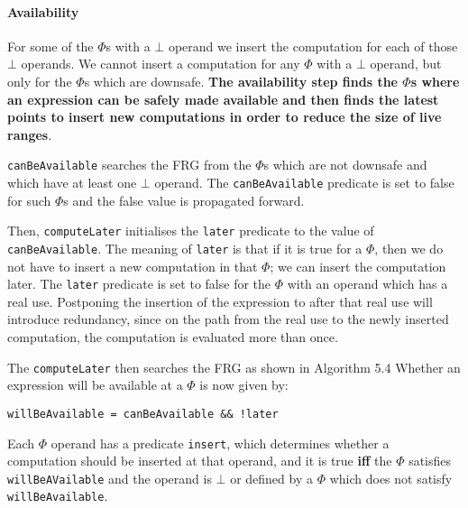 \documentclass[a4paper,12pt, notitlepage]{article}
\renewcommand{\iff}{\textbf{ iff }}
\begin{document}
\paragraph*{Availability}
For some of the $\Phi$s with a $\bot$ operand we insert the computation for each
of those $\bot$ operands. We cannot insert a computation for any $\Phi$ with a
$\bot$ operand, but only for the $\Phi$s which are downsafe. \textbf{The 
availability step finds the $\Phi$s where an expression can be safely made
available and then finds the latest points to insert new computations in
order to reduce the size of live ranges}.

\texttt{canBeAvailable} searches the FRG from the $\Phi$s which are not downsafe
and which have at least one $\bot$ operand. The \texttt{canBeAvailable}
predicate is set to false for such $\Phi$s and the false value is propagated
forward.

Then, \texttt{computeLater} initialises the \texttt{later} predicate to the
value of \\ \texttt{canBeAvailable}. The meaning of \texttt{later} is that if it is
true for a $\Phi$, then we do not have to insert a new computation in that
$\Phi$; we can insert the computation later. The \texttt{later} predicate is set
to false for the $\Phi$ with an operand which has a real use. Postponing the
insertion of the expression to after that real use will introduce redundancy,
since on the path from the real use to the newly inserted computation, the
computation is evaluated more than once.

The \texttt{computeLater} then searches the FRG as shown in Algorithm 5.4
Whether an expression will be available at a $\Phi$ is now given by:
\begin{verbatim}
willBeAvailable = canBeAvailable && !later
\end{verbatim}
Each $\Phi$ operand has a predicate \texttt{insert}, which determines whether a
computation should be inserted at that operand, and it is true \iff the $\Phi$
satisfies \texttt{willBeAVailable} and the operand is $\bot$ or defined by a
$\Phi$ which does not satisfy \texttt{willBeAvailable}.
\end{document}

